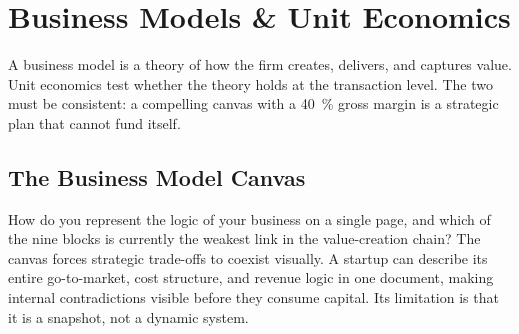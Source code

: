 \chapter{Business Models \& Unit Economics}\label{ch:business-models}


A business model is a theory of how the firm creates, delivers, and captures value. Unit economics test whether the theory holds at the transaction level. The two must be consistent: a compelling canvas with a \qty{40}{\percent} gross margin is a strategic plan that cannot fund itself.

\section{The Business Model Canvas}\label{sec:bmc}

How do you represent the logic of your business on a single page, and which of the nine blocks is currently the weakest link in the value-creation chain? The canvas forces strategic trade-offs to coexist visually. A startup can describe its entire go-to-market, cost structure, and revenue logic in one document, making internal contradictions visible before they consume capital. Its limitation is that it is a snapshot, not a dynamic system.

